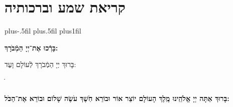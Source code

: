 \documentclass[twoside, openany, parskip=half, 11pt]{book}
\begin{document}
\enlargethispage{\baselineskip}

\vspace{1.25\baselineskip}
\chapter[שחרית לחול]{קריאת שמע וברכותיה}

\newcommand{\barachu}{
\begin{minipage}{0.6\textwidth}
\leftskip=0pt plus-.5fil
\rightskip=0pt plus.5fil
\parfillskip=0pt plus1fil
\begin{large}

\shatz
\begin{Large}\textbf{בָּרְֿכוּ אֶת־יְיָ הַמְֿבֹרָךְ:}\end{Large}
\end{large}

\vspace{12pt}

\shatzvkahal
בָּרוּךְ יְיָ הַמְֿבֹרָךְ לְֿעוֹלָם וָעֶד:
\end{minipage}
ֺֺ%

%
}


\barachu

\textbf{
בָּרוּךְ אַתָּה יְיָ אֱלֹהֵֽינוּ מֶֽלֶךְ הָעוֹלָם יוֹצֵר אוֹר וּבוֹרֵא חֹֽשֶׁךְ עֹשֶׂה שָׁלוֹם וּבוֹרֵא אֶת־הַכֹּל:
}

\newcommand{\hameir}{
\firstword{הַמֵּאִיר}
לָאָֽרֶץ וְֿלַדָּרִים עָלֶֽיהָ בְּֿרַחֲמִים וּבְטוּבוֹ מְֿחַדֵּשׁ בְּֿכׇל־יוֹם תָּמִיד מַעֲשֵׂה בְֿרֵאשִׁית: \source{תהלים קד}מָה־רַבּ֬וּ מַעֲשֶׂ֨יךָ ׀ יְיָ֗ כֻּ֭לָּם בְּֿחׇכְמָ֣ה עָשִׂ֑יתָ מָלְֿאָ֥ה הָ֝אָ֗רֶץ קִנְיָנֶֽךָ׃ הַמֶּֽלֶךְ הַמְֿרוֹמָם לְֿבַדּוֹ מֵאָז הַמְֿשֻׁבָּח וְֿהַמְֿפֹאָר וְֿהַמִּתְנַשֵּׂא מִימוֹת עוֹלָם: אֱלֹהֵי עוֹלָם בְּֿרַחֲמֶיךָ הָרַבִּים רַחֵם עָלֵינוּ אֲדוֹן עֻזֵּֽנוּ צוּר מִשְׂגַּבֵּנוּ מָגֵן יִשְׁעֵֽנוּ מִשְׂגָּב בַּעֲדֵֽנוּ: אֵ֗ל בָּ֗רוּךְ גְּֿ֗דוֹל דֵּ֗עָה הֵ֗כִין וּ֗פָעַל זׇׇׇׇׇׇׇׇׇׇָ֗הֳרֵי חַ֗מָּה ט֗וֹב יָ֗צַר כָּ֗בוֹד לִ֗שְׁמוֹ מְֿ֗אוֹרוֹת נָ֗תַן סְֿ֗בִיבוֹת עֻ֗זּוֹ פִּ֗נּוֹת צְֿ֗בָאָיו קְֿ֗דוֹשִׁים ר֗וֹמֲמֵי שַׁ֗דַּי תָּ֗מִיד מְֿסַפְּֿרִים כְּֿבוֹד־אֵל וּקְדֻשָׁתוֹ: תִּתְבָּרַךְ יְיָ אֱלֹהֵֽינוּ עַל־שֶׁבַח מַעֲשֵׂי יָדֶֽיךָ וְֿעַל־מְֿאֽוֹרֵי אוֹר שֶׁעָשִֽׂיתָ יְֿפָאֲרֽוּךָ סֶּֽלָה:
}
\end{document}
